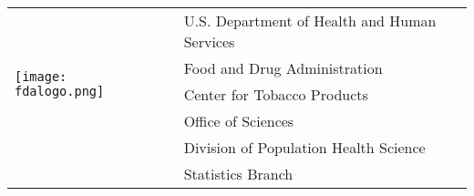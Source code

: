 \documentclass[letterpaper,11pt]{article}
\begin{document}

\vspace{-25pt}%
\begin{tabular}[t]{lp{1in}l}
	\multirow{5}{*}{\texttt{[image: fdalogo.png]}} &  & U.S. Department of Health and Human Services\\
																								&  & Food and Drug Administration \\
																								&  & Center for Tobacco Products \\
																								&  & Office of Sciences \\
																								&  & Division of Population Health Science \\
																								&  & Statistics Branch \\
\end{tabular}

\newline\vspace{15pt} \newline\vspace{0.015in}
\end{document}
